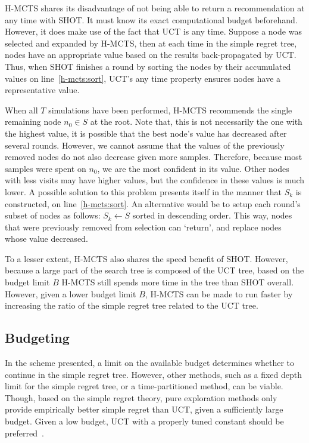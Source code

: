 \documentclass{kecsmstr}
\begin{document}
H-MCTS shares its disadvantage of not being able to return a recommendation at any time with SHOT. It must know its exact computational budget beforehand. However, it does make use of the fact that UCT is any time. Suppose a node was selected and expanded by H-MCTS, then at each time in the simple regret tree, nodes have an appropriate value based on the results back-propagated by UCT. Thus, when SHOT finishes a round by sorting the nodes by their accumulated values on line~\ref{h-mcts:sort}, UCT's any time property ensures nodes have a representative value.

When all $T$ simulations have been performed, H-MCTS recommends the single remaining node $n_0 \in S$ at the root. Note that, this is not necessarily the one with the highest value, it is possible that the best node's value has decreased after several rounds. However, we cannot assume that the values of the previously removed nodes do not also decrease given more samples. Therefore, because most samples were spent on $n_0$, we are the most confident in its value. Other nodes with less visits may have higher values, but the confidence in these values is much lower. A possible solution to this problem presents itself in the manner that $S_k$ is constructed, on line~\ref{h-mcts:sort}. An alternative would be to setup each round's subset of nodes as follows: $S_k \gets S$ sorted in descending order. This way, nodes that were previously removed from selection can `return', and replace nodes whose value decreased.

To a lesser extent, H-MCTS also shares the speed benefit of SHOT. However, because a large part of the search tree is composed of the UCT tree, based on the budget limit $B$ H-MCTS still spends more time in the tree than SHOT overall. However, given a lower budget limit $B$, H-MCTS can be made to run faster by increasing the ratio of the simple regret tree related to the UCT tree.

\subsection{Budgeting}
In the scheme presented, a limit on the available budget determines whether to continue in the simple regret tree. However, other methods, such as a fixed depth limit for the simple regret tree, or a time-partitioned method, can be viable. Though, based on the simple regret theory, pure exploration methods only provide empirically better simple regret than UCT, given a sufficiently large budget. Given a low budget, UCT with a properly tuned constant should be preferred~.
\end{document}
